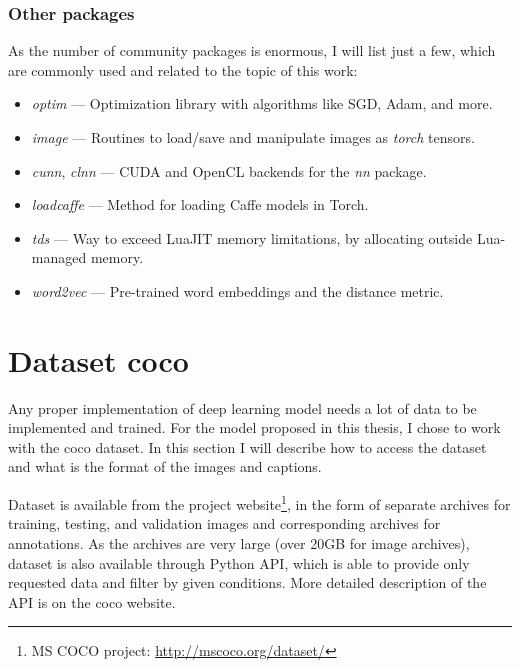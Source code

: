 \subsubsection{Other packages}

As the number of community packages is enormous, I will list just a few, which are commonly used and related to the topic of this work:

\vspace{5mm}
\begin{minipage}{0.9\textwidth}
	\begin{itemize}
		\item \emph{optim} --- Optimization library with algorithms like SGD, Adam, and more.
		\item \emph{image} --- Routines to load/save and manipulate images as \emph{torch} tensors.
		\item \emph{cunn}, \emph{clnn} --- CUDA and OpenCL backends for the \emph{nn} package.
		\item \emph{loadcaffe} --- Method for loading Caffe models in Torch.
		\item \emph{tds} --- Way to exceed LuaJIT memory limitations, by allocating outside Lua-managed memory.
		\item \emph{word2vec} --- Pre-trained word embeddings and the distance metric.
	\end{itemize}
\end{minipage}
\vspace{3mm}

\section{Dataset \gls{coco}}

Any proper implementation of deep learning model needs a lot of data to be implemented and trained. For the model proposed in this thesis, I chose to work with the \gls{coco} dataset. In this section I will describe how to access the dataset and what is the format of the images and captions.

Dataset is available from the project website\footnote{MS COCO project: \url{http://mscoco.org/dataset/}}, in the form of separate archives for training, testing, and validation images and corresponding archives for annotations. As the archives are very large (over 20GB for image archives), dataset is also available through Python API, which is able to provide only requested data and filter by given conditions. More detailed description of the API is on the \gls{coco} website.

